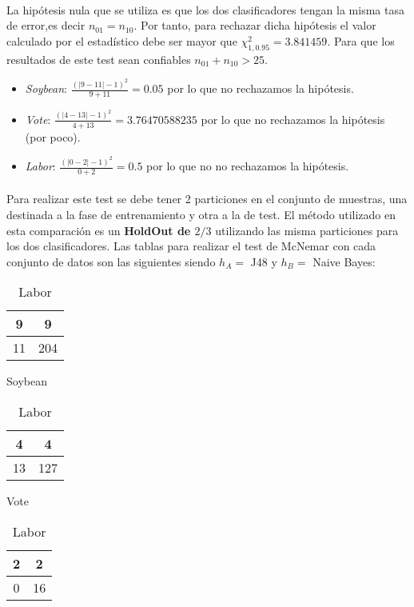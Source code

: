 \documentclass[10pt, a4paper,spanish]{article}
\begin{document}
		\paragraph{}
		La hipótesis nula que se utiliza es que los dos clasificadores tengan la misma tasa de error,es decir $n_{01} = n_{10}$. Por tanto, para rechazar dicha hipótesis el valor calculado por el estadístico debe ser mayor que $\chi^2_{1,0.95} = 3.841459$. Para que los resultados de este test sean confiables $n_{01} + n_{10} > 25$.

		\begin{itemize}
			\item \emph{Soybean}: $\frac{(|9-11|-1)^2}{9+11} = 0.05$ por lo que no rechazamos la hipótesis.
			\item \emph{Vote}: $\frac{(|4-13|-1)^2}{4+13} = 3.76470588235$ por lo que no rechazamos la hipótesis (por poco).
			\item \emph{Labor}: $\frac{(|0-2|-1)^2}{0+2} = 0.5$ por lo que no no rechazamos la hipótesis.
		\end{itemize}


		\paragraph{}
		Para realizar este test se debe tener 2 particiones en el conjunto de muestras, una destinada a la fase de entrenamiento y otra a la de test. El método utilizado en esta comparación es un \textbf{HoldOut de $2/3$} utilizando las misma particiones para los dos clasificadores. Las tablas para realizar el test de McNemar con cada conjunto de datos son las siguientes siendo $h_A = $ J48 y $h_B = $ Naive Bayes:


		\begin{table}[ht]
			\begin{minipage}[b]{0.3\linewidth}
				\centering
				\begin{tabular}{ | c | c | }
					\hline
					9 & 9 \\ \hline
					11 & 204 \\
					\hline
				\end{tabular}
				\caption{Soybean}
			\end{minipage}\hfill
			\begin{minipage}[b]{0.3\linewidth}
				\centering
				\begin{tabular}{ | c | c | }
					\hline
					4 & 4 \\ \hline
					13 & 127 \\
					\hline
				\end{tabular}
				\caption{Vote}
			\end{minipage}\hfill
			\begin{minipage}[b]{0.3\linewidth}
				\centering
				\begin{tabular}{ | c | c | }
					\hline
					2 & 2 \\ \hline
					0 & 16 \\
					\hline
				\end{tabular}
				\caption{Labor}
			\end{minipage}
		\end{table}
\end{document}
